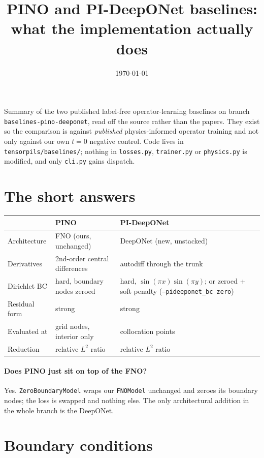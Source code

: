 \documentclass[11pt]{article}
\title{PINO and PI-DeepONet baselines: what the implementation actually does}
\date{\today}
\begin{document}
\maketitle

\noindent
Summary of the two published label-free operator-learning baselines on branch
\texttt{baselines-pino-deeponet}, read off the source rather than the papers. They exist so the
comparison is against \emph{published} physics-informed operator training and not only against our
own $t=0$ negative control. Code lives in \texttt{tensorpils/baselines/}; nothing in
\texttt{losses.py}, \texttt{trainer.py} or \texttt{physics.py} is modified, and only
\texttt{cli.py} gains dispatch.

\section*{The short answers}

\begin{center}
\begin{tabular}{lll}
\toprule
 & \textbf{PINO} & \textbf{PI-DeepONet} \\
\midrule
Architecture      & FNO (ours, unchanged)          & DeepONet (new, unstacked) \\
Derivatives       & 2nd-order central differences  & autodiff through the trunk \\
Dirichlet BC      & hard, boundary nodes zeroed & hard, $\sin(\pi x)\sin(\pi y)$; or zeroed + soft penalty (\texttt{--pideeponet\_bc zero}) \\
Residual form     & strong                         & strong \\
Evaluated at      & grid nodes, interior only      & collocation points \\
Reduction         & relative $L^2$ ratio           & relative $L^2$ ratio \\
\bottomrule
\end{tabular}
\end{center}

\paragraph{Does PINO just sit on top of the FNO?} Yes. \texttt{ZeroBoundaryModel} wraps our
\texttt{FNOModel} unchanged and zeroes its boundary nodes; the loss is swapped and nothing else.
The only architectural addition in the whole branch is the DeepONet.

\section*{Boundary conditions}
\end{document}
